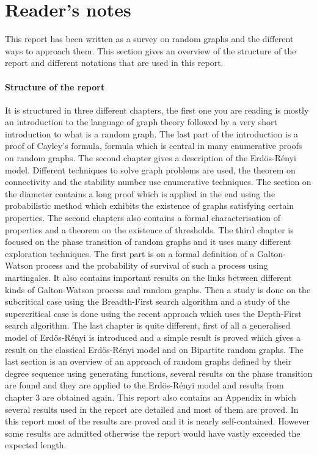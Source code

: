 \newtheorem{theorem}{Theorem}[section]
\newtheorem{corollary}{Corollary}[theorem]
\newtheorem{lemma}[theorem]{Lemma}
\section{Reader's notes}
This report has been written as a survey on random graphs and the different ways to approach them.
This section gives an overview of the structure of the report and different notations that are used in this report.
\paragraph{Structure of the report}
It is structured in three different chapters, the first one you are reading is mostly an introduction to the language of graph theory followed by a very short introduction to what is a random graph.
The last part of the introduction is a proof of Cayley's formula, formula which is central in many enumerative proofs on random graphs.
\newline
The second chapter gives a description of the Erd\"os-R\'enyi model. 
Different techniques to solve graph problems are used, the theorem on connectivity and the stability number use enumerative techniques. 
The section on the diameter contains a long proof which is applied in the end using the probabilistic method which exhibits the existence of graphs satisfying certain properties.
The second chapters also contains a formal characterisation of properties and a theorem on the existence of thresholds.
\newline
The third chapter is focused on the phase transition of random graphs and it uses many different exploration techniques.
The first part is on a formal definition of a Galton-Watson process and the probability of survival of such a process using martingales.
It also contains important results on the links between different kinds of Galton-Watson process and random graphs.
Then a study is done on the subcritical case using the Breadth-First search algorithm and a study of the supercritical case 
is done using the recent approach which uses the Depth-First search algorithm.
\newline
The last chapter is quite different, first of all a generalised model of Erd\"os-R\'enyi is introduced and a simple result is proved which gives a result on the classical Erd\"os-R\'enyi model and on Bipartite random graphs.
The last section is an overview of an approach of random graphs defined by their degree sequence using generating functions, several results on the phase transition are found and they are applied to the Erd\"os-R\'enyi model and results from chapter 3 are obtained again.
\newline
This report also contains an Appendix in which several results used in the report are detailed and most of them are proved.
\newline
In this report most of the results are proved and it is nearly self-contained.
However some results are admitted otherwise the report would have vastly exceeded the expected length.
